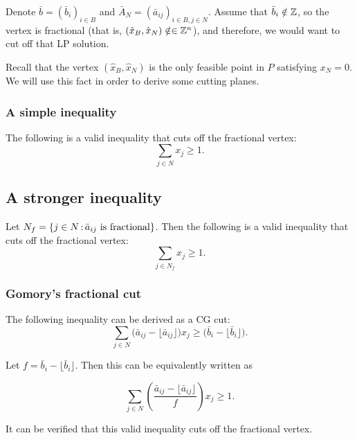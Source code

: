 \vspace{0.2cm}

Denote $\bar b=(\bar b_i)_{i\in B}$ and  $\bar A_N=(\bar a_{ij})_{i\in B, j\in N}$. Assume that $\bar b_i\notin {\mathbb{Z}}$, so the vertex is fractional \big(that is, $(\hat x_B,\hat x_N)\notin \in {\mathbb{Z}}^n$\big), and therefore, we would want to cut off that LP solution.

\begin{remark}{}{} Recall that the vertex $(\hat x_B,\hat x_N)$ is the only feasible point in $P$ satisfying $x_N=0$. We will use this fact in order to derive some cutting planes.
\end{remark}

\subsubsection{A simple inequality}
The following is a valid inequality that cuts off the fractional vertex:
$$\sum_{j\in N}x_j\geq 1.$$
\subsection{A stronger inequality}
Let $N_f=\{j\in N{\,:\,} \bar a_{ij}\ \mbox{is fractional}\}$. Then the following is a valid inequality that cuts off the fractional vertex:
$$\sum_{j\in N_f}x_j\geq 1.$$
\subsubsection{Gomory's fractional cut}
The following inequality can be derived as a CG cut:
\begin{equation}\sum_{j\in N}\big(\bar a_{ij}-\lfloor \bar a_{ij} \rfloor \big)x_j\geq (\bar b_{i}-\lfloor \bar b_{i} \rfloor \big).\end{equation}

Let $f = \bar b_{i}-\lfloor \bar b_{i} \rfloor $.  Then this can be equivalently written as 

\begin{equation}\sum_{j\in N}\left( \frac{\bar a_{ij}-\lfloor \bar a_{ij} \rfloor}{f}\right) x_j\geq 1.\end{equation}



It can be verified that this valid inequality cuts off the fractional vertex.



